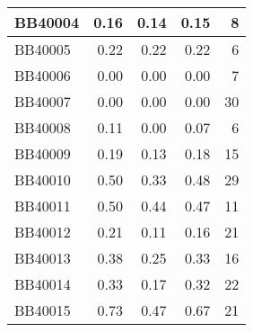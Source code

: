 \begin{longtable}{|l|r|r|r||r|}
	\hline
	BB40004 & \cellcolor[rgb]{ .988,  1,  .992}0.16 & \cellcolor[rgb]{ .384,  .745,  .478}0.14 & \cellcolor[rgb]{ .835,  .933,  .863}0.15 & \cellcolor[rgb]{ .984,  .835,  .847}8 \\
	\hline
	BB40005 & \cellcolor[rgb]{ .988,  1,  .992}0.22 & \cellcolor[rgb]{ .988,  1,  .992}0.22 & \cellcolor[rgb]{ .988,  1,  .992}0.22 & \cellcolor[rgb]{ .988,  .875,  .886}6 \\
	\hline
	BB40006 & \cellcolor[rgb]{ .988,  1,  .992}0.00 & \cellcolor[rgb]{ .988,  1,  .992}0.00 & \cellcolor[rgb]{ .988,  1,  .992}0.00 & \cellcolor[rgb]{ .988,  .855,  .867}7 \\
	\hline
	BB40007 & \cellcolor[rgb]{ .988,  1,  .992}0.00 & \cellcolor[rgb]{ .988,  1,  .992}0.00 & \cellcolor[rgb]{ .988,  1,  .992}0.00 & \cellcolor[rgb]{ .973,  .412,  .42}30 \\
	\hline
	BB40008 & \cellcolor[rgb]{ .988,  1,  .992}0.11 & \cellcolor[rgb]{ .384,  .745,  .478}0.00 & \cellcolor[rgb]{ .784,  .914,  .82}0.07 & \cellcolor[rgb]{ .988,  .875,  .886}6 \\
	\hline
	BB40009 & \cellcolor[rgb]{ .988,  1,  .992}0.19 & \cellcolor[rgb]{ .384,  .745,  .478}0.13 & \cellcolor[rgb]{ .945,  .98,  .957}0.18 & \cellcolor[rgb]{ .98,  .702,  .71}15 \\
	\hline
	BB40010 & \cellcolor[rgb]{ .988,  1,  .992}0.50 & \cellcolor[rgb]{ .384,  .745,  .478}0.33 & \cellcolor[rgb]{ .902,  .965,  .918}0.48 & \cellcolor[rgb]{ .976,  .431,  .439}29 \\
	\hline
	BB40011 & \cellcolor[rgb]{ .988,  1,  .992}0.50 & \cellcolor[rgb]{ .384,  .745,  .478}0.44 & \cellcolor[rgb]{ .655,  .859,  .71}0.47 & \cellcolor[rgb]{ .984,  .78,  .788}11 \\
	\hline
	BB40012 & \cellcolor[rgb]{ .988,  1,  .992}0.21 & \cellcolor[rgb]{ .384,  .745,  .478}0.11 & \cellcolor[rgb]{ .686,  .871,  .733}0.16 & \cellcolor[rgb]{ .98,  .588,  .596}21 \\
	\hline
	BB40013 & \cellcolor[rgb]{ .988,  1,  .992}0.38 & \cellcolor[rgb]{ .384,  .745,  .478}0.25 & \cellcolor[rgb]{ .749,  .898,  .788}0.33 & \cellcolor[rgb]{ .98,  .682,  .694}16 \\
	\hline
	BB40014 & \cellcolor[rgb]{ .988,  1,  .992}0.33 & \cellcolor[rgb]{ .384,  .745,  .478}0.17 & \cellcolor[rgb]{ .933,  .976,  .945}0.32 & \cellcolor[rgb]{ .98,  .569,  .576}22 \\
	\hline
	BB40015 & \cellcolor[rgb]{ .988,  1,  .992}0.73 & \cellcolor[rgb]{ .384,  .745,  .478}0.47 & \cellcolor[rgb]{ .847,  .937,  .871}0.67 & \cellcolor[rgb]{ .98,  .588,  .596}21 \\

\end{longtable}
